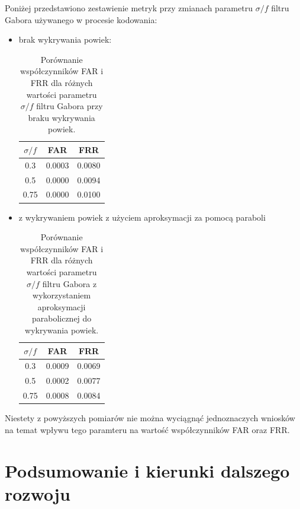 \documentclass[10pt,polish,a4paper,oneside]{ppfcmthesis}
\begin{document}
\noindent
Poniżej przedstawiono zestawienie metryk przy zmianach parametru $\sigma/f$ filtru Gabora używanego
w procesie kodowania:

\begin{itemize}

  \item brak wykrywania powiek:

  \begin{table}[ht]
    \centering
    \begin{tabular}{c|c|c}
      \rowcolor{gray!20}
      $\mathit{\sigma/f}$ & FAR & FRR \\
      \hline\hline
      0.3 & 0.0003 & 0.0080 \\
      \hline
      0.5 & 0.0000 & 0.0094 \\
      \hline
      0.75 & 0.0000 & 0.0100 \\
    \end{tabular}
    \caption{Porównanie współczynników FAR i FRR dla różnych wartości parametru $\mathit{\sigma/f}$ filtru Gabora
    przy braku wykrywania powiek.}
  \end{table}

  \item z wykrywaniem powiek z użyciem aproksymacji za pomocą paraboli

  \begin{table}[ht]
    \centering
    \begin{tabular}{c|c|c}
      \rowcolor{gray!20}
      $\mathit{\sigma/f}$ & FAR & FRR \\
      \hline\hline
      0.3 & 0.0009 & 0.0069 \\
      \hline
      0.5 & 0.0002 & 0.0077 \\
      \hline
      0.75 & 0.0008 & 0.0084 \\
    \end{tabular}
    \caption{Porównanie współczynników FAR i FRR dla różnych wartości parametru $\mathit{\sigma/f}$ filtru Gabora
    z wykorzystaniem aproksymacji parabolicznej do wykrywania powiek.}
  \end{table}
\end{itemize}

Niestety z powyższych pomiarów nie można wyciągną\'c jednoznaczych wniosków na temat wpływu tego
paramteru na wartoś\'c współczynników FAR oraz FRR.
 \chapter{Podsumowanie i kierunki dalszego rozwoju}
\end{document}
